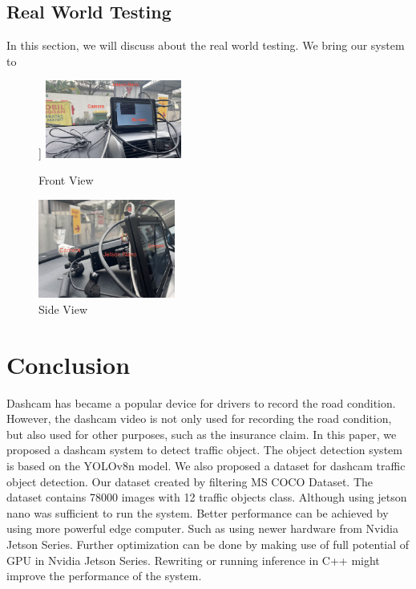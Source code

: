 \documentclass[conference]{IEEEtran}
\begin{document}
\subsection{Real World Testing}
In this section, we will discuss about the real world testing. We bring our system to 
\begin{figure}[h]]
    \centering
    \includegraphics[width=0.4\textwidth,keepaspectratio]{mounted_camera_front_view.jpg}
    \caption{Front View}
    \label{fig:front_view}
\end{figure}

\begin{figure}[h]
    \centering
    \includegraphics[width=0.4\textwidth,keepaspectratio]{mounted_camera_side_view.jpg}
    \caption{Side View}
    \label{fig:side_view}
\end{figure}

\section{Conclusion}
Dashcam has became a popular device for drivers to record the road condition. However, the dashcam video is not only used for recording the road condition, but also used for other purposes, such as the insurance claim. 
In this paper, we proposed a dashcam system to detect traffic object. The object detection system is based on the YOLOv8n model. We also proposed a dataset for dashcam traffic object detection. Our dataset created by filtering MS COCO Dataset. The dataset contains 78000 images with 12 traffic objects class.
Although using jetson nano was sufficient to run the system. Better performance can be achieved by using more powerful edge computer. Such as using newer hardware from Nvidia Jetson Series. Further optimization can be done by making use of full potential of GPU in Nvidia Jetson Series. Rewriting or running inference in C++ might improve the performance of the system.
\end{document}
